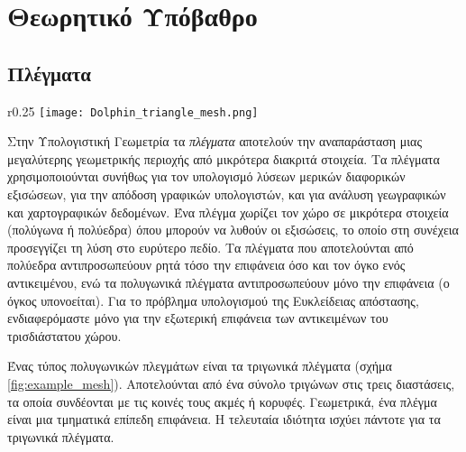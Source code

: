 \chapter{Θεωρητικό Υπόβαθρο}
\label{ch:theoretical_background}

\section{Πλέγματα}
\begin{wrapfigure}{r}{0.25\textwidth}
    \centering
    \texttt{[image: Dolphin\_triangle\_mesh.png]}
    \caption[Παράδειγμα Τριγωνικού Πλέγματος]{
        Παράδειγμα τριγωνικού πλέγματος που αναπαριστά ένα δελφίνι.
    }
    \label{fig:example_mesh}
\end{wrapfigure}
\label{sec:triangle_meshes}
Στην Υπολογιστική Γεωμετρία τα \textit{πλέγματα} αποτελούν την αναπαράσταση
μιας μεγαλύτερης γεωμετρικής περιοχής από μικρότερα διακριτά στοιχεία.
Τα πλέγματα χρησιμοποιούνται συνήθως για τον υπολογισμό λύσεων μερικών 
διαφορικών εξισώσεων, για την απόδοση γραφικών υπολογιστών, και για
ανάλυση γεωγραφικών και χαρτογραφικών δεδομένων.
Ένα πλέγμα χωρίζει τον χώρο σε μικρότερα στοιχεία (πολύγωνα ή πολύεδρα) όπου
μπορούν να λυθούν οι εξισώσεις, το οποίο στη συνέχεια προσεγγίζει τη λύση 
στο ευρύτερο πεδίο. 
Τα πλέγματα που αποτελούνται από πολύεδρα αντιπροσωπεύουν ρητά τόσο την 
επιφάνεια όσο και τον όγκο ενός αντικειμένου, ενώ τα πολυγωνικά 
πλέγματα αντιπροσωπεύουν μόνο την επιφάνεια (ο όγκος υπονοείται).
Για το πρόβλημα υπολογισμού της Ευκλείδειας απόστασης, ενδιαφερόμαστε 
μόνο για την εξωτερική επιφάνεια των αντικειμένων του τρισδιάστατου χώρου. 

Ένας τύπος πολυγωνικών πλεγμάτων είναι τα τριγωνικά πλέγματα 
(σχήμα \ref{fig:example_mesh}).
Αποτελούνται από ένα σύνολο τριγώνων στις τρεις διαστάσεις, 
τα οποία συνδέονται με τις κοινές τους ακμές ή κορυφές. 
Γεωμετρικά, ένα πλέγμα είναι μια τμηματικά επίπεδη επιφάνεια.
Η τελευταία ιδιότητα ισχύει πάντοτε για τα τριγωνικά πλέγματα.

